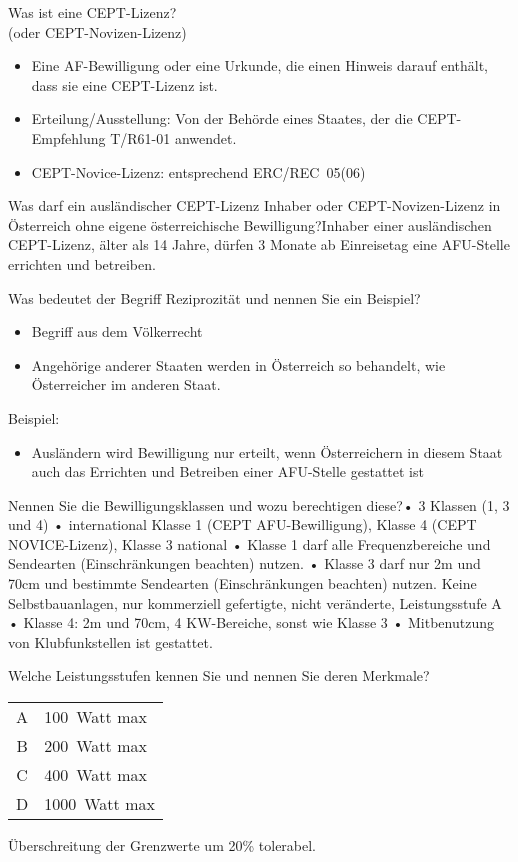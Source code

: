 \documentclass[avery5371,grid,frame,a4paper]{flashcards}
\newcommand{\card}[3]{
  \begin{flashcard}[{\chap} -- #1]{#2}#3\end{flashcard}
}
\begin{document}
\card{38}{Was ist eine CEPT-Lizenz? \\ (oder CEPT-Novizen-Lizenz)}{
  \begin{itemize}\itemsep1pt
    \item Eine AF-Bewilligung oder eine Urkunde, die einen Hinweis darauf enthält, dass sie eine CEPT-Lizenz ist.
    \item Erteilung/Ausstellung: Von der Behörde eines Staates, der die CEPT-Empfehlung T/R61-01 anwendet.
    \item CEPT-Novice-Lizenz: entsprechend ERC/REC~05(06)
  \end{itemize}
}

\card{39}{Was darf ein ausländischer CEPT-Lizenz Inhaber oder CEPT-Novizen-Lizenz in Österreich ohne eigene österreichische Bewilligung?}{Inhaber einer ausländischen CEPT-Lizenz, älter als 14 Jahre, dürfen 3 Monate ab Einreisetag eine AFU-Stelle errichten und betreiben.}

\card{40}{Was bedeutet der Begriff Reziprozität und nennen Sie ein Beispiel?}{
  \begin{itemize}\itemsep1pt
    \item Begriff aus dem Völkerrecht
    \item Angehörige anderer Staaten werden in Österreich so behandelt, wie Österreicher im anderen Staat.
  \end{itemize}
  Beispiel:
  \begin{itemize}\itemsep1pt
    \item Ausländern wird Bewilligung nur erteilt, wenn Österreichern in diesem Staat auch das Errichten und Betreiben einer AFU-Stelle gestattet ist
  \end{itemize}
}

\card{41}{Nennen Sie die Bewilligungsklassen und wozu berechtigen diese?}{•  3 Klassen (1, 3 und 4) •  international Klasse 1 (CEPT AFU-Bewilligung), Klasse 4 (CEPT NOVICE-Lizenz), Klasse 3 national •  Klasse 1 darf alle Frequenzbereiche und Sendearten (Einschränkungen beachten) nutzen. •  Klasse 3 darf nur 2m und 70cm und bestimmte Sendearten (Einschränkungen beachten) nutzen. Keine Selbstbauanlagen, nur kommerziell gefertigte, nicht veränderte, Leistungsstufe A •  Klasse 4: 2m und 70cm, 4 KW-Bereiche, sonst wie Klasse 3 •  Mitbenutzung von Klubfunkstellen ist gestattet.}

\card{42}{Welche Leistungsstufen kennen Sie und nennen Sie deren Merkmale?}{
  \begin{center}
    \vspace{5pt}
    \begin{tabular}{cl}
      A & 100~Watt max \\
      B & 200~Watt max \\
      C & 400~Watt max \\
      D & 1000~Watt max
    \end{tabular}
  \end{center}
  Überschreitung der Grenzwerte um 20\% tolerabel.
}
\end{document}
